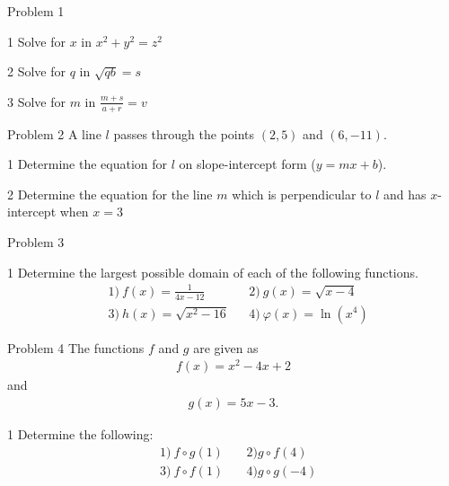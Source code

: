 \begin{opgavetekst}{Problem 1}
\end{opgavetekst}
\begin{delopgave}{1}
	Solve for $x$ in $x^2 + y^2 = z^2$
\end{delopgave}
\begin{delopgave}{2}
	Solve for $q$ in $\sqrt{qb}=s$
\end{delopgave}
\begin{delopgave}{3}
	Solve for $m$ in $\frac{m+s}{a+r}=v$
\end{delopgave}
%
%
%
%
%
%
\begin{opgavetekst}{Problem 2}
	A line $l$ passes through the points $(2,5)$ and $(6,-11)$. 
\end{opgavetekst}
\begin{delopgave}{1}
	Determine the equation for $l$ on slope-intercept form ($y = mx + b$).
\end{delopgave}
\begin{delopgave}{2}
	Determine the equation for the line $m$ which is perpendicular to $l$ and has $x$-intercept when $x = 3$
\end{delopgave}
%
%
%
%
%
\begin{opgavetekst}{Problem 3}
\end{opgavetekst}
\begin{delopgave}{1}
	Determine the largest possible domain of each of the following functions.
	\begin{align*}
		&1) \ f(x) = \frac{1}{4x - 12} &    &2) \ g(x) = \sqrt{x - 4} \\
		&3) \ h(x) = \sqrt{x^2 - 16} &    &4) \ \varphi(x) = \ln(x^4)	
	\end{align*}	 
\end{delopgave}
%
%
%
%
%
\begin{opgavetekst}{Problem 4}
	The functions $f$ and $g$ are given as
	\begin{align*}
		f(x) = x^2-4x+2
	\end{align*}
	and
	\begin{align*}
		g(x) = 5x-3.
	\end{align*}
\end{opgavetekst}
\begin{delopgave}{1}
	Determine the following:
		\begin{align*}
		&1) \ f \circ g(1) \ &  &2) g \circ f(4) \\
		&3) \ f \circ f(1) \ &   &4) g \circ g (-4)
	\end{align*}
\end{delopgave}
